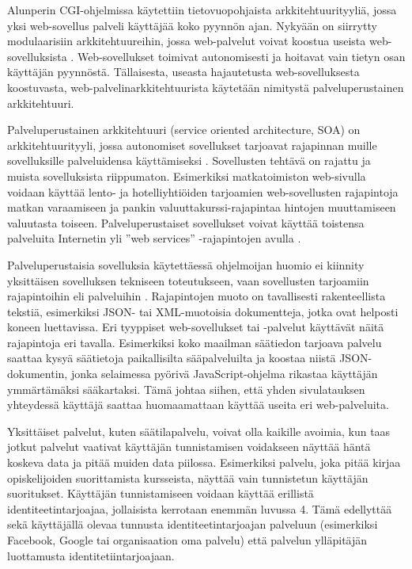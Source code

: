Alunperin CGI-ohjelmissa käytettiin tietovuopohjaista arkkitehtuurityyliä, jossa yksi web-sovellus palveli käyttäjää koko pyynnön ajan. Nykyään on siirrytty modulaarisiin arkkitehtuureihin, jossa web-palvelut voivat koostua useista web-sovelluksista \cite{soa}. Web-sovellukset toimivat autonomisesti ja hoitavat vain tietyn osan käyttäjän pyynnöstä. Tällaisesta, useasta hajautetusta web-sovelluksesta koostuvasta, web-palvelinarkkitehtuurista käytetään nimitystä palveluperustainen arkkitehtuuri.

Palveluperustainen arkkitehtuuri (service oriented architecture, SOA) on arkkitehtuurityyli, jossa autonomiset sovellukset tarjoavat rajapinnan muille sovelluksille palveluidensa käyttämiseksi \cite{soa}. Sovellusten tehtävä on rajattu ja muista sovelluksista riippumaton. Esimerkiksi matkatoimiston web-sivulla voidaan käyttää lento- ja hotelliyhtiöiden tarjoamien web-sovellusten rajapintoja matkan varaamiseen ja pankin valuuttakurssi-rajapintaa hintojen muuttamiseen valuutasta toiseen. Palveluperustaiset sovellukset voivat käyttää toistensa palveluita Internetin yli ''web services'' -rajapintojen avulla \cite{soa}.

Palveluperustaisia sovelluksia käytettäessä ohjelmoijan huomio ei kiinnity yksittäisen sovelluksen tekniseen toteutukseen, vaan sovellusten tarjoamiin rajapintoihin eli palveluihin \cite{soa}. Rajapintojen muoto on tavallisesti rakenteellista tekstiä, esimerkiksi JSON- tai XML-muotoisia dokumentteja, jotka ovat helposti koneen luettavissa. Eri tyyppiset web-sovellukset tai -palvelut käyttävät näitä rajapintoja eri tavalla. Esimerkiksi koko maailman säätiedon tarjoava palvelu saattaa kysyä säätietoja paikallisilta sääpalveluilta ja koostaa niistä JSON-dokumentin, jonka selaimessa pyörivä JavaScript-ohjelma rikastaa käyttäjän ymmärtämäksi sääkartaksi. Tämä johtaa siihen, että yhden sivulatauksen yhteydessä käyttäjä saattaa huomaamattaan käyttää useita eri web-palveluita.

Yksittäiset palvelut, kuten säätilapalvelu, voivat olla kaikille avoimia, kun taas jotkut palvelut vaativat käyttäjän tunnistamisen voidakseen näyttää häntä koskeva data ja pitää muiden data piilossa. Esimerkiksi palvelu, joka pitää kirjaa opiskelijoiden suorittamista kursseista, näyttää vain tunnistetun käyttäjän suoritukset. Käyttäjän tunnistamiseen voidaan käyttää erillistä identiteetintarjoajaa, jollaisista kerrotaan enemmän luvussa 4. Tämä edellyttää sekä käyttäjällä olevaa tunnusta identiteetintarjoajan palveluun (esimerkiksi Facebook, Google tai organisaation oma palvelu) että palvelun ylläpitäjän luottamusta identitetiintarjoajaan.